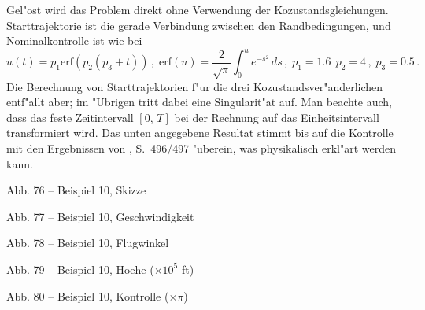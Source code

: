 \documentclass[12pt,a4paper,twoside,leqno]{article}
\begin{document}
Gel"ost wird das Problem direkt ohne Verwendung der Kozustandsgleichungen.
Starttrajektorie ist die gerade Verbindung zwischen den Randbedingungen,
und Nominalkontrolle ist wie bei \cite{Stoer}
\[
u(t) = p_1 \text{erf}(p_2(p_3 + t))\,, \;
\text{erf}(u) = \frac{2}{\sqrt{\pi}}\int_0^u e^{-s^2}\, ds\,, \;
p_1 =  1.6\,\; p_2 = 4\,, \; p_3 = 0.5\,.
\]
Die Berechnung von Starttrajektorien f"ur die drei Kozustandsver"anderlichen
entf"allt aber; im "Ubrigen tritt dabei eine Singularit"at auf. Man beachte auch,
dass das feste Zeitintervall $[0,\,T]$ bei der Rechnung auf das
Einheitsintervall transformiert wird. Das unten angegebene Resultat stimmt
bis auf die Kontrolle mit den Ergebnissen von \cite{Stoer},  S.\ 496/497 "uberein,
was physikalisch erkl"art werden kann.
\par\vspace{0.5ex}
\bc
\begin{minipage}[t]{5.5cm}
Abb. 76 -- Beispiel 10, Skizze
\end{minipage}
\ec
\bc
\begin{minipage}[t]{5.5cm}
Abb. 77 -- Beispiel 10, Geschwindigkeit
\end{minipage}
\;\;
\begin{minipage}[t]{5.5cm}
Abb. 78 -- Beispiel 10, Flugwinkel
\end{minipage}
\ec
\bc
\begin{minipage}[t]{5.5cm}
Abb. 79 -- Beispiel 10, Hoehe ($\times 10^5$ ft)
\end{minipage}
\;\;
\begin{minipage}[t]{5.5cm}
Abb. 80 -- Beispiel 10, Kontrolle ($\times \pi$)
\end{minipage}
\ec
\end{document}

